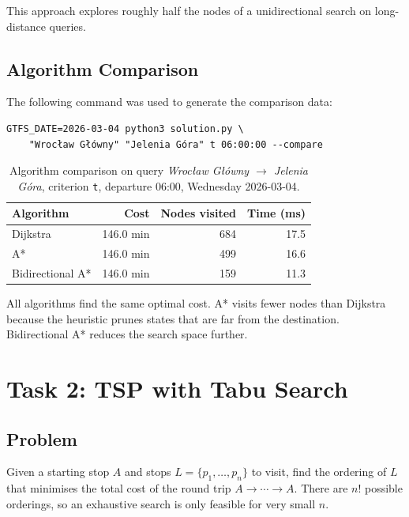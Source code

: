\documentclass[12pt,a4paper]{article}
\begin{document}
This approach explores roughly half the nodes of a unidirectional search on
long-distance queries.

\subsection{Algorithm Comparison}

The following command was used to generate the comparison data:

\begin{verbatim}
GTFS_DATE=2026-03-04 python3 solution.py \
    "Wrocław Główny" "Jelenia Góra" t 06:00:00 --compare
\end{verbatim}

\begin{table}[H]
\centering
\begin{tabular}{lrrr}
\toprule
\textbf{Algorithm} & \textbf{Cost} & \textbf{Nodes visited} & \textbf{Time (ms)} \\
\midrule
Dijkstra          & 146.0 min & 684 & 17.5 \\
A*                & 146.0 min & 499 & 16.6 \\
Bidirectional A*  & 146.0 min & 159 & 11.3 \\
\bottomrule
\end{tabular}
\caption{Algorithm comparison on query \textit{Wrocław Główny $\to$ Jelenia Góra},
         criterion \texttt{t}, departure 06:00, Wednesday 2026-03-04.}
\end{table}

All algorithms find the same optimal cost. A* visits fewer nodes than Dijkstra
because the heuristic prunes states that are far from the destination.
Bidirectional A* reduces the search space further.

\section{Task 2: TSP with Tabu Search}

\subsection{Problem}

Given a starting stop $A$ and stops $L = \{p_1, \ldots, p_n\}$ to visit, find
the ordering of $L$ that minimises the total cost of the round trip
$A \to \cdots \to A$. There are $n!$ possible orderings, so an exhaustive
search is only feasible for very small $n$.
\end{document}

